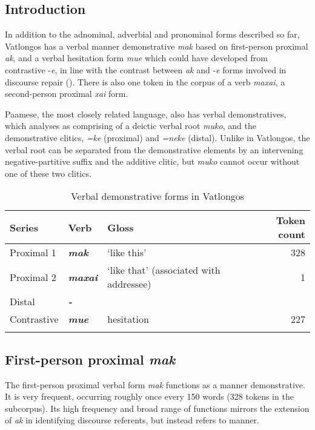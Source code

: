 \documentclass[output=paper,colorlinks,citecolor=brown]{langscibook}
\begin{document}
\subsection{Introduction}
\label{sec:ridge:5.1}

In addition to the adnominal, adverbial and pronominal forms described so far, Vatlongos has a verbal manner demonstrative \textit{mak} based on first-person proximal \textit{ak}, and a verbal hesitation form \textit{mue} which could have developed from contrastive -\textit{e}, in line with the contrast between \textit{ak} and -\textit{e} forms involved in discourse repair (). There is also one token in the corpus of a verb \textit{maxai}, a second-person proximal \textit{xai} form.

Paamese, the most closely related language, also has verbal demonstratives, which \citet[229]{Crowley1982} analyses as comprising of a deictic verbal root \textit{muko}, and the demonstrative clitics, \textit{=ke} (proximal) and \textit{=neke} (distal). Unlike in Vatlongos, the verbal root can be separated from the demonstrative elements by an intervening negative-partitive suffix and the additive clitic, but \textit{muko} cannot occur without one of these two clitics.

\begin{table}
\caption{Verbal demonstrative forms in Vatlongos}
\label{tab:ridge:9}
\begin{tabularx}{\textwidth}{lXlr}
\lsptoprule
\textbf{Series} & \textbf{Verb} & \textbf{Gloss} & \textbf{Token count}\\
\midrule 
Proximal 1 & \textbf{\textit{mak}} & {‘like this’} & {328}\\
Proximal 2 & \textbf{\textit{maxai}} & {‘like that’ (associated with addressee)} & {1}\\
Distal & \textbf{\textit{{}-}} &  & \\
Contrastive & \textbf{\textit{mue}} & {hesitation} & {227}\\
\lspbottomrule
\end{tabularx}
\end{table}

\subsection{First-person proximal \textit{mak}}
\label{sec:ridge:5.2}

The first-person proximal verbal form \textit{mak} functions as a manner demonstrative. It is very frequent, occurring roughly once every 150 words (328 tokens in the subcorpus). Its high frequency and broad range of functions mirrors the extension of \textit{ak} in identifying discourse referents, but instead refers to manner.
\end{document}
